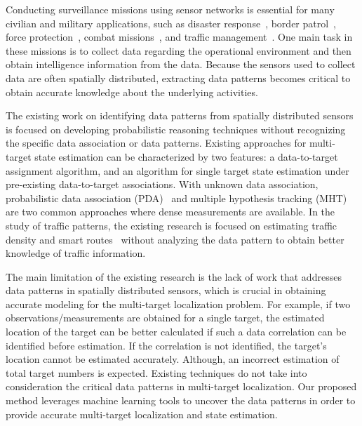 \documentclass[letterpaper, 10 pt, conference]{ieeeconf}
\begin{document}
Conducting surveillance missions using sensor networks is essential for many civilian and military applications, such as disaster response~\cite{GeorgeEtAl10}, border patrol~\cite{OnurEDA07}, force protection~\cite{AhmedCCK15,CasbeerMeierCao13}, combat missions~\cite{BokarevaEtAl06}, and traffic management~\cite{min2011real}. One main task in these missions is to collect data regarding the operational environment and then obtain intelligence information from the data. Because the sensors used to collect data are often spatially distributed, extracting data patterns becomes critical to obtain accurate knowledge about the underlying activities.

The existing work on identifying data patterns from spatially distributed sensors is focused on developing probabilistic reasoning techniques without recognizing the specific data association or data patterns. Existing approaches for multi-target state estimation can be characterized by two features: a data-to-target assignment algorithm, and an algorithm for single target state estimation under pre-existing data-to-target associations. With unknown data association, probabilistic data association (PDA)~\cite{ShalomDaumHuang09} and multiple hypothesis tracking (MHT)~\cite{Blackman04} are two common approaches where dense measurements are available. In the study of traffic patterns, the existing research is focused on estimating traffic density and smart routes~\cite{min2011real} without analyzing the data pattern to obtain better knowledge of traffic information.


The main limitation of the existing research is the lack of work that addresses data patterns in spatially distributed sensors, which is crucial in obtaining accurate modeling for the multi-target localization problem. For example, if two observations/measurements are obtained for a single target, the estimated location of the target can be better calculated if such a data correlation can be identified before estimation. If the correlation is not identified, the target's location cannot be estimated accurately. Although, an incorrect estimation of total target numbers is expected. Existing techniques do not take into consideration the critical data patterns in multi-target localization. Our proposed method leverages machine learning tools to uncover the data patterns in order to provide accurate multi-target localization and state estimation.   

\end{document}
